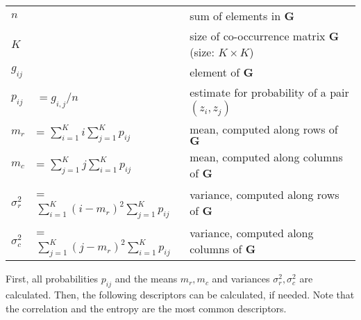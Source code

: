 \begin{table}[h]
	\begin{tabular}{lll}
		$n$	& & sum of elements in $\mathbf{G}$ \\
		$K$ & & size of co-occurrence matrix $\mathbf{G}$ (size: $K \times K$) \\
		$g_{ij}$ & & element of $\mathbf{G}$ \\
		$p_{ij}$ & $= g_{i,j} / n$ & estimate for probability of a pair $(z_i,z_j)$ \\
		$m_r$ &= $\sum\limits_{i=1}^{K} i \sum\limits_{j=1}^{K} p_{ij}$ & mean, computed along rows of $\mathbf{G}$ \\
		$m_c$ &= $\sum\limits_{j=1}^{K} j \sum\limits_{i=1}^{K} p_{ij}$ & mean, computed along columns of $\mathbf{G}$ \\
		$\sigma_r^2$ &= $\sum\limits_{i=1}^{K} (i-m_r)^2 \sum\limits_{j=1}^{K} p_{ij}$ & variance, computed along rows of $\mathbf{G}$ \\
		$\sigma_c^2$ &= $\sum\limits_{j=1}^{K} (j-m_r)^2 \sum\limits_{i=1}^{K} p_{ij}$ & variance, computed along columns of $\mathbf{G}$ \\
	\end{tabular}
\end{table}

First, all probabilities $p_{ij}$ and the means $m_r, m_c$ and variances $\sigma_r^2,\sigma_c^2$ are calculated.
Then, the following descriptors can be calculated, if needed. Note that the correlation and the entropy are the most common descriptors.

